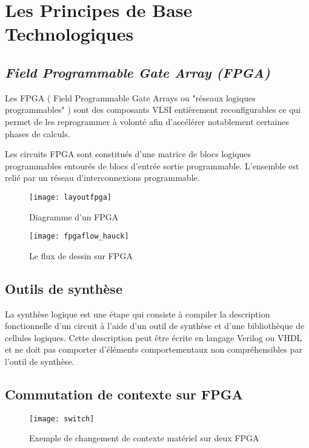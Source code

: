 \chapter{Les Principes de Base Technologiques}
\label{chap:principe}
\OnehalfSpacing
\section{\emph{Field Programmable Gate Array (FPGA)}}
\label{sec:fpga}
 
Les FPGA ( Field Programmable Gate Arrays ou "réseaux logiques programmables" ) sont des composants VLSI 
entièrement reconfigurables ce qui permet de les reprogrammer à volonté afin d'accélérer notablement certaines 
phases de calculs\cite{fpgaweb}.

Les circuits FPGA sont constitués d'une matrice de blocs logiques programmables entourés de blocs d'entrée 
sortie programmable. L'ensemble est relié par un réseau d'interconnexions programmable. 

\begin{figure}[h]
	\label{fig:layoutfpga}
	\centering
	\texttt{[image: layoutfpga]}
	\caption{Diagramme d'un FPGA\cite{fpgaprototype}}
	\vspace{-2mm}
\end{figure}

\begin{figure}[h]
	\label{fig:fpgaflow}
	\centering
	\texttt{[image: fpgaflow\_hauck]}
	\caption{Le flux de dessin sur FPGA}
	\vspace{-2mm}
\end{figure}

\section{Outils de synthèse}

La synthèse logique est une étape qui consiste à compiler la description fonctionnelle d'un circuit 
à l'aide d'un outil de synthèse et d'une bibliothèque de cellules logiques. 
Cette description peut être écrite en langage Verilog ou VHDL et ne doit pas comporter d'éléments 
comportementaux non compréhensibles par l'outil de synthèse.

\section{Commutation de contexte sur FPGA}
\label{sec:contextswitch}

\Blindtext[1]

\begin{figure}[h]
	\label{fig:switch}
	\centering
	\texttt{[image: switch]}
	\caption{Exemple de changement de contexte matériel sur deux FPGA}
	\vspace{-2mm}
\end{figure}
